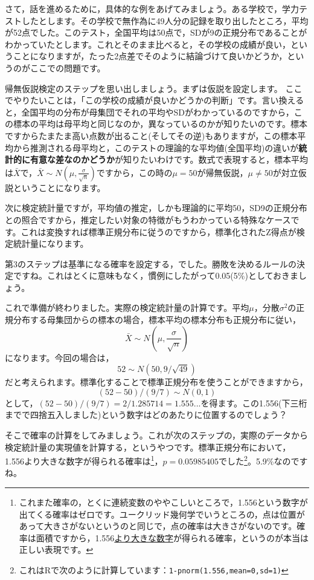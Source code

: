 \documentclass{ltjsbook}
\begin{document}
さて，話を進めるために，具体的な例をあげてみましょう。ある学校で，学力テストしたとします。その学校で無作為に49人分の記録を取り出したところ，平均が52点でした。このテスト，全国平均は50点で，SDが9の正規分布であることがわかっていたとします。これとそのまま比べると，その学校の成績が良い，ということになりますが，たった2点差でそのように結論づけて良いかどうか，というのがここでの問題です。

帰無仮説検定のステップを思い出しましょう。まずは仮説を設定します。
ここでやりたいことは，「この学校の成績が良いかどうかの判断」です。言い換えると，全国平均の分布が母集団でそれの平均やSDがわかっているのですから，この標本の平均は母平均と同じなのか，異なっているのかが知りたいのです。標本ですからたまたま高い点数が出ること(そしてその逆)もありますが，この標本平均から推測される母平均と，このテストの理論的な平均値(全国平均)の違いが\textbf{統計的に有意な差なのかどうか}が知りたいわけです。数式で表現すると，標本平均は$\bar{X}$で，$\bar{X} \sim N(\mu, \frac{\sigma}{\sqrt{n}})$ですから，この時の$\mu=50$が帰無仮説，$\mu \neq 50$が対立仮説ということになります。

次に検定統計量ですが，平均値の推定，しかも理論的に平均50，SD9の正規分布との照合ですから，推定したい対象の特徴がもうわかっている特殊なケースです。これは変換すれば標準正規分布に従うのですから，標準化されたZ得点が検定統計量になります。

第3のステップは基準になる確率を設定する，でした。勝敗を決めるルールの決定ですね。これはとくに意味もなく，慣例にしたがって0.05(5\%)としておきましょう。

これで準備が終わりました。実際の検定統計量の計算です。平均$\mu$，分散$\sigma^2$の正規分布する母集団からの標本の場合，標本平均の標本分布も正規分布に従い，
\[ \bar{X} \sim N(\mu,\frac{\sigma}{\sqrt{n}}) \]
になります。今回の場合は，
\[ 52 \sim N(50,9/\sqrt{49}) \]
だと考えられます。標準化することで標準正規分布を使うことができますから，
\[ (52-50)/(9/7) \sim N(0,1) \]
として，$ (52-50)/(9/7) =2/1.285714=1.555... $を得ます。この1.556(下三桁までで四捨五入しました)という数字はどのあたりに位置するのでしょう？

そこで確率の計算をしてみましょう。これが次のステップの，実際のデータから検定統計量の実現値を計算する，というやつです。標準正規分布において，1.556より大きな数字が得られる確率は\footnote{これまた確率の，とくに連続変数のややこしいところで，1.556という数字が出てくる確率はゼロです。ユークリッド幾何学でいうところの，点は位置があって大きさがないというのと同じで，点の確率は大きさがないのです。確率は面積ですから，1.556\underline{より大きな数字}が得られる確率，というのが本当は正しい表現です。}，$p=0.05985405$でした\footnote{これはRで次のように計算しています：\texttt{1-pnorm(1.556,mean=0,sd=1)}}。5.9\%なのですね。
\end{document}
